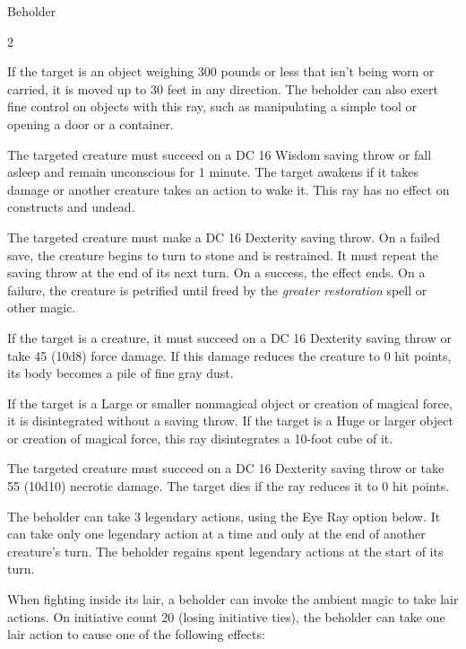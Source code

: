 \documentclass[10pt,a4paper,twoside,bg=print,twocolumn,openany,nodeprecatedcode]{dndbook}
\begin{document}
\begin{DndMonster}[float*=b,width=\textwidth + 8pt]{Beholder}
\begin{multicols}{2}
\begin{description}
If the target is an object weighing 300 pounds or less that isn't being worn or carried, it is moved up to 30 feet in any direction. The beholder can also exert fine control on objects with this ray, such as manipulating a simple tool or opening a door or a container.

\item[7. Sleep Ray.]
The targeted creature must succeed on a DC 16 Wisdom saving throw or fall asleep and remain unconscious for 1 minute. The target awakens if it takes damage or another creature takes an action to wake it. This ray has no effect on constructs and undead.
\item[8. Petrification Ray.]
The targeted creature must make a DC 16 Dexterity saving throw. On a failed save, the creature begins to turn to stone and is restrained. It must repeat the saving throw at the end of its next turn. On a success, the effect ends. On a failure, the creature is petrified until freed by the  \textit{greater restoration} spell or other magic.
\item[9. Disintegration Ray.]
If the target is a creature, it must succeed on a DC 16 Dexterity saving throw or take 45 (10d8) force damage. If this damage reduces the creature to 0 hit points, its body becomes a pile of fine gray dust.

If the target is a Large or smaller nonmagical object or creation of magical force, it is disintegrated without a saving throw. If the target is a Huge or larger object or creation of magical force, this ray disintegrates a 10-foot cube of it.

\item[10. Death Ray.]
The targeted creature must succeed on a DC 16 Dexterity saving throw or take 55 (10d10) necrotic damage. The target dies if the ray reduces it to 0 hit points.
\end{description}

The beholder can take 3 legendary actions, using the Eye Ray option below. It can take only one legendary action at a time and only at the end of another creature's turn. The beholder regains spent legendary actions at the start of its turn.

\begin{DndMonsterLegendaryActions}
\end{DndMonsterLegendaryActions}
When fighting inside its lair, a beholder can invoke the ambient magic to take lair actions. On initiative count 20 (losing initiative ties), the beholder can take one lair action to cause one of the following effects:



\end{multicols}
\end{DndMonster}
\end{document}
